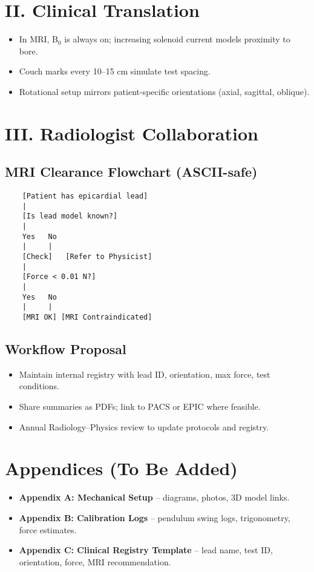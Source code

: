 \section{II. Clinical Translation}
\begin{itemize}
	\item In MRI, B$_0$ is always on; increasing solenoid current models proximity to bore.
	\item Couch marks every 10--15 cm simulate test spacing.
	\item Rotational setup mirrors patient-specific orientations (axial, sagittal, oblique).
\end{itemize}

\section{III. Radiologist Collaboration}
\subsection*{MRI Clearance Flowchart (ASCII-safe)}
\begin{verbatim}
	[Patient has epicardial lead]
	|
	[Is lead model known?]
	|
	Yes   No
	|     |
	[Check]   [Refer to Physicist]
	|
	[Force < 0.01 N?]
	|
	Yes   No
	|     |
	[MRI OK] [MRI Contraindicated]
\end{verbatim}

\subsection*{Workflow Proposal}
\begin{itemize}
	\item Maintain internal registry with lead ID, orientation, max force, test conditions.
	\item Share summaries as PDFs; link to PACS or EPIC where feasible.
	\item Annual Radiology--Physics review to update protocols and registry.
\end{itemize}

\section*{Appendices (To Be Added)}
\begin{itemize}
	\item \textbf{Appendix A: Mechanical Setup} -- diagrams, photos, 3D model links.
	\item \textbf{Appendix B: Calibration Logs} -- pendulum swing logs, trigonometry, force estimates.
	\item \textbf{Appendix C: Clinical Registry Template} -- lead name, test ID, orientation, force, MRI recommendation.
\end{itemize}